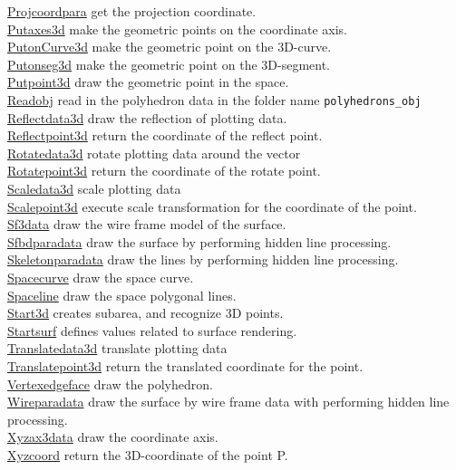 \documentclass[papersize,a4paper,12pt]{article}
\begin{document}
\begin{tabbing}
\hyperlink{projcoordpara}{Projcoordpara} \> get the projection coordinate.\\
\hyperlink{putaxes3d}{Putaxes3d} \> make the geometric points on the coordinate axis. \\
\hyperlink{putonCurve3d}{PutonCurve3d} \> make the geometric point on the 3D-curve.\\
\hyperlink{putonseg3d}{Putonseg3d} \> make the geometric point on the 3D-segment.\\
\hyperlink{putpoint3d}{Putpoint3d} \> draw the geometric point in the space.\\
\hyperlink{readobj}{Readobj} \> read in the polyhedron data in the folder name \verb|polyhedrons_obj|\\
\hyperlink{reflectdata3d}{Reflectdata3d} \> draw the reflection of plotting data.\\
\hyperlink{reflectpoint3d}{Reflectpoint3d} \> return the coordinate of the reflect point.\\
\hyperlink{rotatedata3d}{Rotatedata3d} \> rotate plotting data around the vector\\
\hyperlink{rotatepoint3d}{Rotatepoint3d} \> return the coordinate of the rotate point.\\
\hyperlink{scaledata3d}{Scaledata3d} \>scale plotting data \\
\hyperlink{scalepoint3d}{Scalepoint3d} \> execute scale transformation for the coordinate of the point.\\
\hyperlink{sf3data}{Sf3data} \> draw the wire frame model of the surface.\\
\hyperlink{sfbdparadata}{Sfbdparadata} \> draw the surface by performing hidden line processing.\\
\hyperlink{skeletonparadata}{Skeletonparadata} \> draw the lines by performing hidden line processing.\\
\hyperlink{spacecurve}{Spacecurve} \> draw the space curve.\\
\hyperlink{spaceline}{Spaceline} \> draw the space polygonal lines.\\
\hyperlink{start3d}{Start3d} \> creates subarea, and recognize 3D points.\\
\hyperlink{startsurf}{Startsurf} \> defines values related to surface rendering.\\
\hyperlink{translatedata3d}{Translatedata3d} \> translate plotting data\\
\hyperlink{translatepoint3d}{Translatepoint3d} \> return the translated coordinate for the point.\\\hyperlink{vertexedgeface}{Vertexedgeface} \> draw the polyhedron.\\
\hyperlink{wireparadata}{Wireparadata} \> draw the surface by wire frame data with performing hidden line processing.\\
\hyperlink{xyzax3data}{Xyzax3data} \> draw the coordinate axis.\\
\hyperlink{xyzcoord}{Xyzcoord} \> return the 3D-coordinate of the point P.\\

\end{tabbing}
\end{document}
